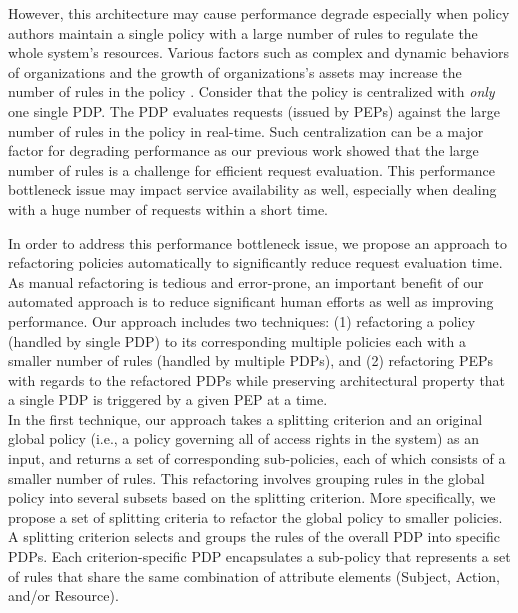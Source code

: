 However, this architecture may cause performance degrade
especially when policy authors maintain a single policy with a large number of rules to regulate the whole system's resources.
Various factors such as complex and dynamic behaviors of organizations and the growth of organizations's assets may increase the
number of rules in the policy \cite{policymanagement}.
Consider that the policy is centralized with \emph{only} one single PDP.
The PDP evaluates requests (issued by PEPs) against
the large number of rules in the policy in real-time.
Such centralization can be a major factor for degrading performance as our previous work \cite{Xengine} showed that the large number of rules is a challenge for efficient request evaluation.
This performance bottleneck issue may impact service
availability as well, especially when dealing with a huge number of requests within a short time.


In order to address this performance bottleneck issue,
we propose an approach to refactoring policies automatically to significantly reduce
request evaluation time.
As manual refactoring is tedious and
error-prone, an important benefit of our automated approach is to reduce significant human efforts as well as
improving performance.
Our approach includes two techniques: (1) refactoring a policy (handled by single PDP) to its corresponding multiple policies each with a smaller number of rules (handled by multiple PDPs),
and (2) refactoring PEPs with regards to the refactored PDPs while preserving architectural property that a single PDP is triggered by a given PEP at a time.\\

In the first technique, our approach takes a splitting criterion and an original global policy (i.e., a policy governing all of access rights in the system) as an input, and returns a set of
corresponding sub-policies, each of which consists of a smaller number of rules.
This refactoring involves grouping rules in the global policy into several subsets based on the splitting criterion.
More specifically, we propose a set of splitting criteria to
refactor the global policy to smaller policies.
A splitting criterion selects and groups the rules of the overall PDP into specific PDPs.
Each criterion-specific PDP encapsulates a sub-policy that represents a set of rules that share the same combination
of attribute elements (Subject, Action, and/or Resource).

